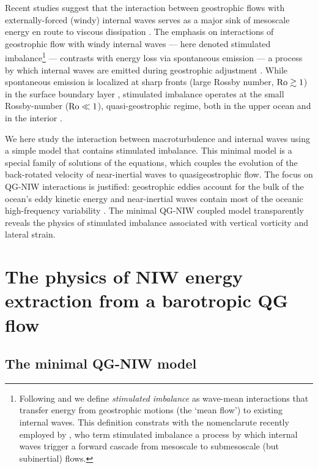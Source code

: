 \documentclass{jfm}
\begin{document}
Recent studies suggest that the interaction
between geostrophic flows with externally-forced (windy) internal waves serves
as a major sink of mesoscale energy en route to viscous dissipation
\citep{xie_vanneste2015,taylor_straub2016,wagner_young2016,barkan_etal2016}.
The emphasis on interactions of geostrophic flow with windy internal waves ---
here denoted stimulated imbalance\footnote{Following \cite{xie_vanneste2015} and
\cite{wagner_young2016} we define
\textit{stimulated imbalance} as wave-mean interactions that transfer energy from
geostrophic motions (the `mean flow') to existing internal
waves. This definition constrats with the nomenclarute recently employed by
\cite{barkan_etal2016}, who term stimulated imbalance a process by which
internal waves trigger a forward cascade from mesoscale to submesoscale (but
subinertial) flows.} ---
contrasts with energy loss via spontaneous emission --- a process by which
internal waves are emitted during geostrophic adjustment
\citep[e.g., ][]{shakespeare_hogg2017}. While spontaneous emission is localized
at sharp fronts (large Rossby number, $\mathrm{Ro}\gtrsim 1$) in the surface boundary
layer \citep[e.g., ][]{shakespeare_hogg2017}, stimulated imbalance operates at
the small Rossby-number ($\mathrm{Ro}\ll 1$), quasi-geostrophic regime, both in the upper
ocean and in the interior \citep[e.g., ][]{xie_vanneste2015}.

We here study the interaction between macroturbulence and internal waves using a
simple model that contains stimulated imbalance. This minimal model is a special
family of solutions of the \cite{xie_vanneste2015} equations, which couples the evolution of
the back-rotated velocity of near-inertial waves to quasigeostrophic flow. The
focus on QG-NIW interactions is justified:  geostrophic eddies account for the
bulk of the ocean's eddy kinetic energy \cite[$90\%$,][]{ferrari_wunsch2009} and
near-inertial waves contain most of the oceanic high-frequency variability
\citep{alford_etal2016}. The minimal QG-NIW coupled model transparently reveals
the physics of stimulated imbalance associated with vertical vorticity and lateral strain.

\section{The physics of NIW energy extraction from a barotropic QG flow}

\subsection{The \cite{xie_vanneste2015} minimal QG-NIW model}
\end{document}
